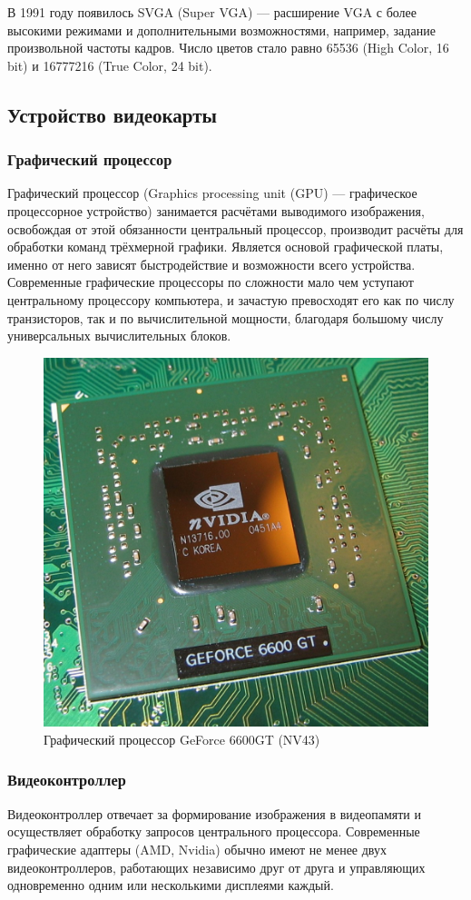 В 1991 году появилось SVGA (Super VGA) --- расширение VGA с более высокими режимами и дополнительными возможностями, например, задание произвольной частоты кадров. Число цветов стало равно 65536 (High Color, 16 bit) и 16777216 (True Color, 24 bit).


\subsection{Устройство видеокарты}

\subsubsection{Графический процессор}

Графический процессор (Graphics processing unit (GPU) — графическое процессорное устройство) занимается расчётами выводимого изображения, освобождая от этой обязанности центральный процессор, производит расчёты для обработки команд трёхмерной графики. Является основой графической платы, именно от него зависят быстродействие и возможности всего устройства. Современные графические процессоры по сложности мало чем уступают центральному процессору компьютера, и зачастую превосходят его как по числу транзисторов, так и по вычислительной мощности, благодаря большому числу универсальных вычислительных блоков.

\begin{figure}[ht!]
\begin{center}
\includegraphics[width=0.3\linewidth]{img/6600GT_GPU.jpg}
\caption{Графический процессор GeForce 6600GT (NV43)}
\end{center}
\end{figure}

\subsubsection{Видеоконтроллер}

Видеоконтроллер отвечает за формирование изображения в видеопамяти и осуществляет обработку запросов центрального процессора. Современные графические адаптеры (AMD, Nvidia) обычно имеют не менее двух видеоконтроллеров, работающих независимо друг от друга и управляющих одновременно одним или несколькими дисплеями каждый.

